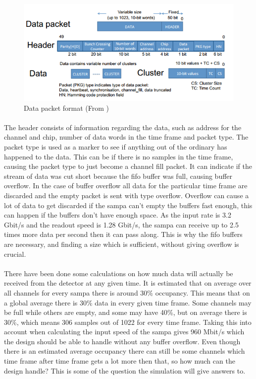 \documentclass[a4paper, 12pt]{report}
\begin{document}
\begin{figure}[h!]
	\centering
		\includegraphics[width=1.0\textwidth]{images/packet.png}
		\caption{Data packet format (From \cite{tdr-015})}
		\label{fig:packet}
\end{figure}

\paragraph{}
The header consists of information regarding the data, such as address for the channel and chip, number of data words in the time frame and packet type.
The packet type is used as a marker to see if anything out of the ordinary has happened to the data.
This can be if there is no samples in the time frame, causing the packet type to just become a channel fill packet.
It can indicate if the stream of data was cut short because the \gls{fifo} buffer was full, causing buffer overflow.
In the case of buffer overflow all data for the particular time frame are discarded and the empty packet is sent with type overflow.
Overflow can cause a lot of data to get discarded if the \gls{sampa} can't empty the buffers fast enough, this can happen if the buffers don't have enough space.
As the input rate is 3.2 Gbit/s and the readout speed is 1.28 Gbit/s, the \gls{sampa} can receive up to 2.5 times more data per second then it can pass along.
This is why the \gls{fifo} buffers are necessary, and finding a size which is sufficient, without giving overflow is crucial.

\paragraph{}
There have been done some calculations on how much data will actually be received from the detector at any given time.
It is estimated that on average over all channels for every \gls{sampa} there is around 30\% occupancy.
This means that on a global average there is 30\% data in every given time frame.
Some channels may be full while others are empty, and some may have 40\%, but on average there is 30\%, which means 306 samples out of 1022 for every time frame.
Taking this into account when calculating the input speed of the \gls{sampa} gives 960 Mbit/s which the design should be able to handle without any buffer overflow.
Even though there is an estimated average occupancy there can still be some channels which time frame after time frame gets a lot more then that, so how much can the design handle?
This is some of the question the simulation will give answers to.
\end{document}
